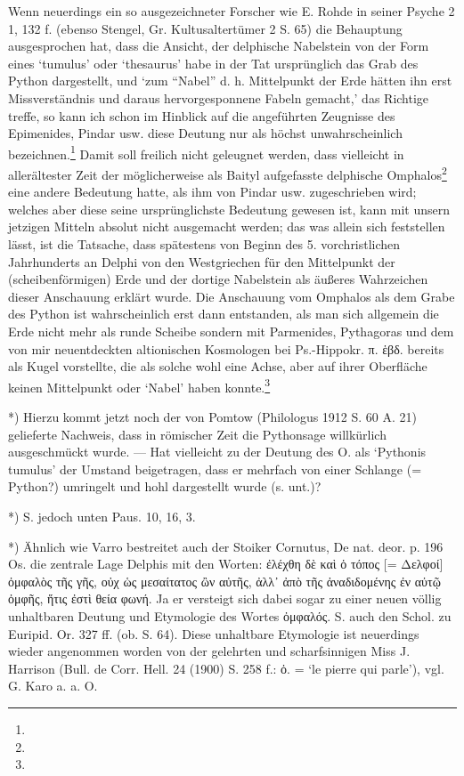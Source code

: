 \documentclass[a4paper, 11pt, oneside]{article}
\begin{document}
Wenn neuerdings ein so ausgezeichneter Forscher wie E. Rohde in seiner Psyche 2 1, 132 f. (ebenso Stengel, Gr. Kultusaltertümer 2 S. 65) die Behauptung ausgesprochen hat, dass die Ansicht, der delphische Nabelstein von der Form eines `tumulus' oder `thesaurus' habe in der Tat ursprünglich das Grab des Python dargestellt, und `zum "`Nabel"' d. h. Mittelpunkt der Erde hätten ihn erst Missverständnis und daraus hervorgesponnene Fabeln gemacht,' das Richtige treffe, so kann ich schon im Hinblick auf die angeführten Zeugnisse des Epimenides, Pindar usw. diese Deutung nur als höchst unwahrscheinlich bezeichnen.\footnote{} Damit soll freilich nicht geleugnet werden, dass vielleicht in allerältester Zeit der möglicherweise als Baityl aufgefasste delphische Omphalos\footnote{} eine andere Bedeutung hatte, als ihm von Pindar usw. zugeschrieben wird; welches aber diese seine ursprünglichste Bedeutung gewesen ist, kann mit unsern jetzigen Mitteln absolut nicht ausgemacht werden; das was allein sich feststellen lässt, ist die Tatsache, dass spätestens von Beginn des 5. vorchristlichen Jahrhunderts an Delphi von den Westgriechen für den Mittelpunkt der (scheibenförmigen) Erde und der dortige Nabelstein als äußeres Wahrzeichen dieser Anschauung erklärt wurde. Die Anschauung vom Omphalos als dem Grabe des Python ist wahrscheinlich erst dann entstanden, als man sich allgemein die Erde nicht mehr als runde Scheibe sondern mit Parmenides, Pythagoras und dem von mir neuentdeckten altionischen Kosmologen bei Ps.-Hippokr. π. ἑβδ. bereits als Kugel vorstellte, die als solche wohl eine Achse, aber auf ihrer Oberfläche keinen Mittelpunkt oder `Nabel' haben konnte.\footnote{}

*) Hierzu kommt jetzt noch der von Pomtow (Philologus 1912 S. 60 A. 21) gelieferte Nachweis, dass in römischer Zeit die Pythonsage willkürlich ausgeschmückt wurde. --- Hat vielleicht zu der Deutung des O. als `Pythonis tumulus' der Umstand beigetragen, dass er mehrfach von einer Schlange (= Python?) umringelt und hohl dargestellt wurde (s. unt.)?

*) S. jedoch unten Paus. 10, 16, 3.

*) Ähnlich wie Varro bestreitet auch der Stoiker Cornutus, De nat. deor. p. 196 Os. die zentrale Lage Delphis mit den Worten: ἐλέχθη δὲ καὶ ὁ τόπος [= Δελφοί] ὀμφαλὸς τῆς γῆς, οὐχ ὡς μεσαίτατος ὢν αὐτῆς, ἀλλ᾽ ἀπὸ τῆς ἀναδιδομένης ἐν αὐτῷ ὀμφῆς, ἥτις ἐστὶ θεία φωνή. Ja er versteigt sich dabei sogar zu einer neuen völlig unhaltbaren Deutung und Etymologie des Wortes ὀμφαλός. S. auch den Schol. zu Euripid. Or. 327 ff. (ob. S. 64). Diese unhaltbare Etymologie ist neuerdings wieder angenommen worden von der gelehrten und scharfsinnigen Miss J. Harrison (Bull. de Corr. Hell. 24 (1900) S. 258 f.: ὀ. = `le pierre qui parle'), vgl. G. Karo a. a. O.
\end{document}

